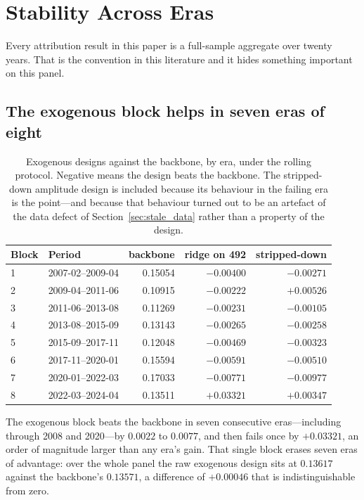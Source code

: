\section{Stability Across Eras}
\label{sec:era_stability}

Every attribution result in this paper is a full-sample aggregate over twenty
years. That is the convention in this literature and it hides something
important on this panel.

\subsection{The exogenous block helps in seven eras of eight}

\begin{table}[H]
\centering
\caption{Exogenous designs against the backbone, by era, under the rolling
protocol. Negative means the design beats the backbone. The stripped-down
amplitude design is included because its behaviour in the failing era is the
point---and because that behaviour turned out to be an artefact of the data
defect of Section~\ref{sec:stale_data} rather than a property of the design.}
\label{tab:eras}
\begin{tabular}{llrrr}
\toprule
Block & Period & backbone & ridge on 492 & stripped-down \\
\midrule
1 & 2007-02--2009-04 & 0.15054 & $-0.00400$ & $-0.00271$ \\
2 & 2009-04--2011-06 & 0.10915 & $-0.00222$ & $+0.00526$ \\
3 & 2011-06--2013-08 & 0.11269 & $-0.00231$ & $-0.00105$ \\
4 & 2013-08--2015-09 & 0.13143 & $-0.00265$ & $-0.00258$ \\
5 & 2015-09--2017-11 & 0.12048 & $-0.00469$ & $-0.00323$ \\
6 & 2017-11--2020-01 & 0.15594 & $-0.00591$ & $-0.00510$ \\
7 & 2020-01--2022-03 & 0.17033 & $-0.00771$ & $-0.00977$ \\
8 & 2022-03--2024-04 & 0.13511 & $\mathbf{+0.03321}$ & $+0.00347$ \\
\bottomrule
\end{tabular}
\end{table}

The exogenous block beats the backbone in seven consecutive eras---including
through 2008 and 2020---by $0.0022$ to $0.0077$, and then fails once by
$+0.03321$, an order of magnitude larger than any era's gain. That single block
erases seven eras of advantage: over the whole panel the raw exogenous design
sits at $0.13617$ against the backbone's $0.13571$, a difference of $+0.00046$
that is indistinguishable from zero.

